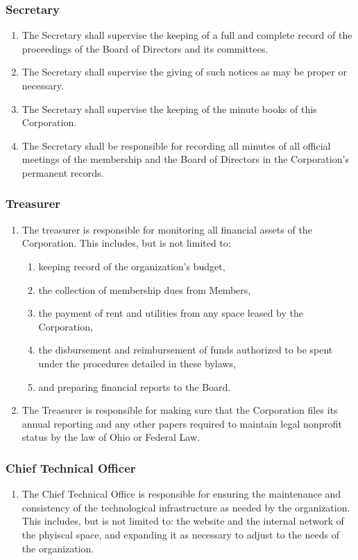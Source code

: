 \documentclass{article}
\begin{document}
\subsubsection{Secretary}
\begin{enumerate}
\item The Secretary shall supervise the keeping of a full and complete record of the 
proceedings of the Board of Directors and its committees.
\item The Secretary shall supervise the giving of such notices as may be proper or 
necessary.
\item The Secretary shall supervise the keeping of the minute books of this Corporation.
\item The Secretary shall be responsible for recording all minutes of all official meetings of 
the membership and the Board of Directors in the Corporation's permanent records.
\end{enumerate}
\subsubsection{Treasurer}
\begin{enumerate}
\item The treasurer is responsible for monitoring all financial assets of the Corporation.  
This includes, but is not limited to:
\begin{enumerate}
\item keeping record of the organization's budget,
\item the collection of membership dues from Members,
\item the payment of rent and utilities from any space leased by the Corporation,
\item the disbursement and reimbursement of funds authorized to be spent under the 
procedures detailed in these bylaws,
\item and preparing financial reports to the Board.
\end{enumerate}
\item The Treasurer is responsible for making sure that the Corporation files its annual 
reporting and any other papers required to maintain legal nonprofit status by the law of 
Ohio or Federal Law.
\end{enumerate}
\subsubsection{Chief Technical Officer}
\begin{enumerate}
\item The Chief Technical Office is responsible for ensuring the maintenance and 
consistency of the technological infrastructure as needed by the organization.  This 
includes, but is not limited to: the website and the internal network of the phyiscal space, and expanding it as necessary to adjust to the needs of the organization.
\end{enumerate}
\end{document}
